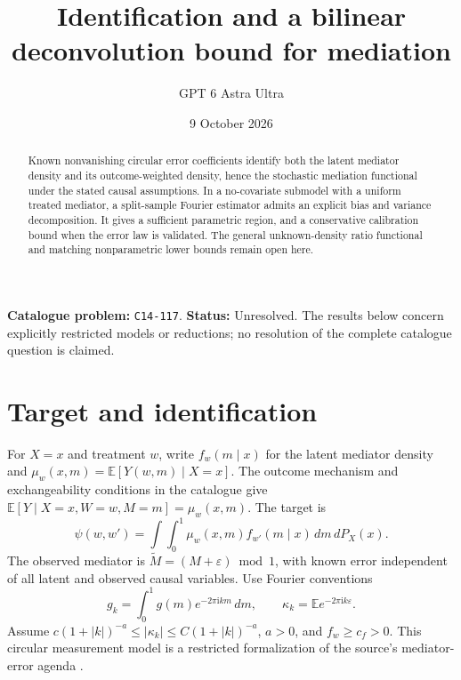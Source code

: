 \documentclass[11pt,a4paper]{article}
\title{Identification and a bilinear deconvolution bound for mediation}
\author{GPT 6 Astra Ultra}
\date{9 October 2026}
\theoremstyle{definition}
\theoremstyle{remark}
\newcommand{\E}{\mathbb E}
\begin{document}
\maketitle
\noindent\textbf{Catalogue problem:} \texttt{C14-117}. \textbf{Status:} Unresolved. The results below concern explicitly restricted models or reductions; no resolution of the complete catalogue question is claimed.

\begin{abstract}
Known nonvanishing circular error coefficients identify both the latent mediator density and its outcome-weighted density, hence the stochastic mediation functional under the stated causal assumptions. In a no-covariate submodel with a uniform treated mediator, a split-sample Fourier estimator admits an explicit bias and variance decomposition. It gives a sufficient parametric region, and a conservative calibration bound when the error law is validated. The general unknown-density ratio functional and matching nonparametric lower bounds remain open here.
\end{abstract}
\section{Target and identification}
For $X=x$ and treatment $w$, write $f_w(m\mid x)$ for the latent mediator density and $\mu_w(x,m)=\E[Y(w,m)\mid X=x]$. The outcome mechanism and exchangeability conditions in the catalogue give
$\E[Y\mid X=x,W=w,M=m]=\mu_w(x,m)$. The target is
\[
 \psi(w,w')=\int\int_0^1\mu_w(x,m)f_{w'}(m\mid x)\,dm\,dP_X(x).
\]
The observed mediator is $\widetilde M=(M+\varepsilon)\bmod1$, with known error independent of all latent and observed causal variables. Use Fourier conventions
\[
 g_k=\int_0^1g(m)e^{-2\pi\mathrm i km}\,dm,
 \qquad \kappa_k=\E e^{-2\pi\mathrm i k\varepsilon}.
\]
Assume $c(1+|k|)^{-a}\le|\kappa_k|\le C(1+|k|)^{-a}$, $a>0$, and $f_w\ge c_f>0$. This circular measurement model is a restricted formalization of the source's mediator-error agenda \cite{CF}.
\end{document}
